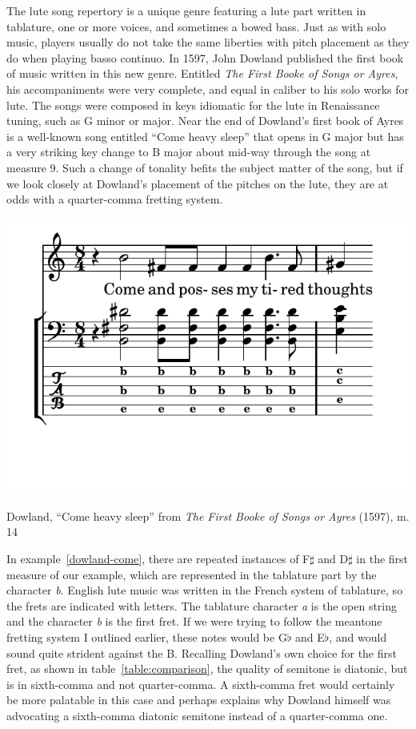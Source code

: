The lute song repertory is a unique genre featuring a lute part written in tablature, one or more
voices, and sometimes a bowed bass. Just as with solo music, players usually do not take the same
liberties with pitch placement as they do when playing basso continuo. In 1597, John Dowland published the
first book of music written in this new genre. Entitled \textit{The First Booke of Songs or Ayres},
his accompaniments were very complete, and equal in caliber to his solo works for lute. The songs
were composed in keys idiomatic for the lute in Renaissance tuning, such as G minor or major. Near the
end of Dowland's first book of Ayres is a well-known song entitled ``Come heavy sleep'' that opens
in G major but has a very striking key change to B major about mid-way through the song at measure 9.
Such a change of tonality befits the subject matter of the song, but if we look closely at
Dowland's placement of the pitches on the lute, they are at odds with a quarter-comma fretting
system.
\begin{example}[h]
\centering
\includegraphics[trim=0 0.5in 0 0,clip=true]{examples/come.pdf}
\caption{Dowland, ``Come heavy sleep'' from \textit{The First Booke of Songs or Ayres} (1597), m. 14}
\label{dowland-come}
\end{example}
In example~\ref{dowland-come}, there are repeated instances of F$\sharp$ and D$\sharp$ in the
first measure of our example, which are represented in the tablature part by the character
\textit{b}. English lute music was written in the French system of tablature, so the
frets are indicated with letters. The tablature character \textit{a} is the open
string and the character \textit{b} is the first fret. If we were trying to follow the
meantone fretting system I outlined earlier, these notes would be G$\flat$ and E$\flat$,
and would sound quite strident against the B. Recalling Dowland's own choice for the
first fret, as shown in table~\ref{table:comparison}, the quality of semitone is diatonic,
but is in sixth-comma and not quarter-comma. A sixth-comma fret would certainly be more
palatable in this case and perhaps explains why Dowland himself was advocating a sixth-comma
diatonic semitone instead of a quarter-comma one.

